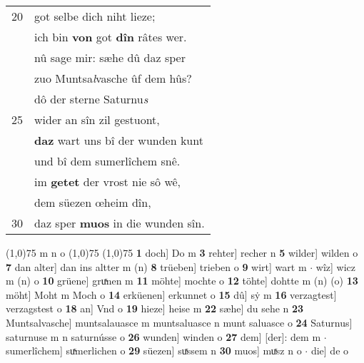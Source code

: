 \documentclass[8pt,a4paper,notitlepage]{article}
\begin{document}
\begin{table}[ht]
\begin{minipage}[t]{0.5\linewidth}
\begin{tabular}{rl}
20 & got selbe dich niht lieze;\\ 
 & ich bin \textbf{von} got \textbf{dîn} râtes wer.\\ 
 & nû sage mir: sæhe dû daz sper\\ 
 & zuo Muntsa\textit{l}vasche ûf dem hûs?\\ 
 & dô der sterne Saturnu\textit{s}\\ 
25 & wider an sîn zil gestuont,\\ 
 & \textbf{daz} wart uns bî der wunden kunt\\ 
 & und bî dem sumerlîchem snê.\\ 
 & im \textbf{getet} der vrost nie sô wê,\\ 
 & dem süezen œheim dîn,\\ 
30 & daz sper \textbf{muos} in die wunden sîn.\\ 
\end{tabular}
\scriptsize
\line(1,0){75} \newline
m n o \newline
\line(1,0){75} \newline
\newline
\line(1,0){75} \newline
\textbf{1} doch] Do m \textbf{3} rehter] recher n \textbf{5} wilder] wilden o \textbf{7} dan alter] dan ins altter m (n) \textbf{8} trüeben] trieben o \textbf{9} wirt] wart m  $\cdot$ wîz] wicz m (n) o \textbf{10} grüene] gruͯnen m \textbf{11} möhte] mochte o \textbf{12} töhte] dohtte m (n) (o) \textbf{13} möht] Moht m Moch o \textbf{14} erküenen] erkunnet o \textbf{15} dû] sẏ m \textbf{16} verzagtest] verzagstest o \textbf{18} an] Vnd o \textbf{19} hieze] heise m \textbf{22} sæhe] du sehe n \textbf{23} Muntsalvasche] muntsalauasce m muntsaluasce n munt saluasce o \textbf{24} Saturnus] saturnuse m n saturnússe o \textbf{26} wunden] winden o \textbf{27} dem] [der]: dem m  $\cdot$ sumerlîchem] suͯmerlichen o \textbf{29} süezen] suͯssem n \textbf{30} muos] muͯsz n o  $\cdot$ die] de o \newline
\end{minipage}
\end{table}
\newpage
\end{document}
